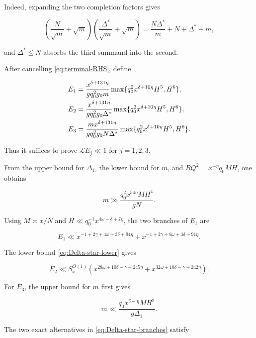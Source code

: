 Indeed, expanding the two completion factors gives

\[
 \left(\frac N{\sqrt m}+\sqrt m\right)
 \left(\frac{\Delta^*}{\sqrt m}+\sqrt m\right)
 =\frac{N\Delta^*}{m}+N+\Delta^*+m,
\]

and $\Delta^*\le N$ absorbs the third summand into the second.

After cancelling \cref{eq:terminal-RHS}, define

\begin{align}
 E_1&=\frac{x^{\delta+131\eta}}{gq_0^2g_0m}
 \max\{q_0^2x^{\delta+10\eta}H^5,H^6\},\notag\\
 E_2&=\frac{x^{\delta+131\eta}}{gq_0^2g_0\Delta^*}
 \max\{q_0^2x^{\delta+10\eta}H^5,H^6\},\notag\\
 E_3&=\frac{mx^{\delta+131\eta}}{gq_0^2g_0N\Delta^*}
 \max\{q_0^2x^{\delta+10\eta}H^5,H^6\}.
 \label{eq:E123}
\end{align}

Thus it suffices to prove $\mathcal LE_j\ll1$ for $j=1,2,3$.

From the upper bound for $\Delta_1$, the lower bound for $m$, and
$RQ^2=x^{-\eta}q_0MH$, one obtains

\begin{equation}\label{eq:m-lower-ledger}
 m\gg\frac{q_0^2x^{54\eta}MH^4}{gN}.
\end{equation}

Using $M\asymp x/N$ and
$H\ll q_0^{-1}x^{4\omega+\delta+7\eta}$, the two branches of $E_1$ are

\begin{equation}\label{eq:E1-ledger}
 E_1\ll
 x^{-1+2\gamma+4\omega+3\delta+94\eta}
 +x^{-1+2\gamma+8\omega+3\delta+91\eta}.
\end{equation}

The lower bound \cref{eq:Delta-star-lower} gives

\begin{equation}\label{eq:E2-ledger}
 E_2\ll S_x^{O(1)}\left(
 x^{28\omega+10\delta-\gamma+245\eta}
 +x^{32\omega+10\delta-\gamma+242\eta}
 \right).
\end{equation}

For $E_3$, the upper bound for $m$ first gives

\begin{equation}\label{eq:m-upper-ledger}
 m\ll\frac{q_0x^{\delta-\eta}MH^2}{g\Delta_1}.
\end{equation}

The two exact alternatives in \cref{eq:Delta-star-branches} satisfy

